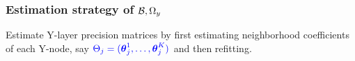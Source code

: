 \documentclass[10pt]{beamer}
\theoremstyle{definition}
\begin{document}
\begin{frame}
\frametitle{Estimation strategy of ${\cal{B}}, \Omega_y$}

Estimate Y-layer precision matrices by first estimating neighborhood coefficients of each Y-node, say ${\color{blue} \Theta_j = ({\boldsymbol{\theta}}_j^1, \ldots, {\boldsymbol{\theta}}_j^K)}$ and then refitting.

\end{frame}
\end{document}
